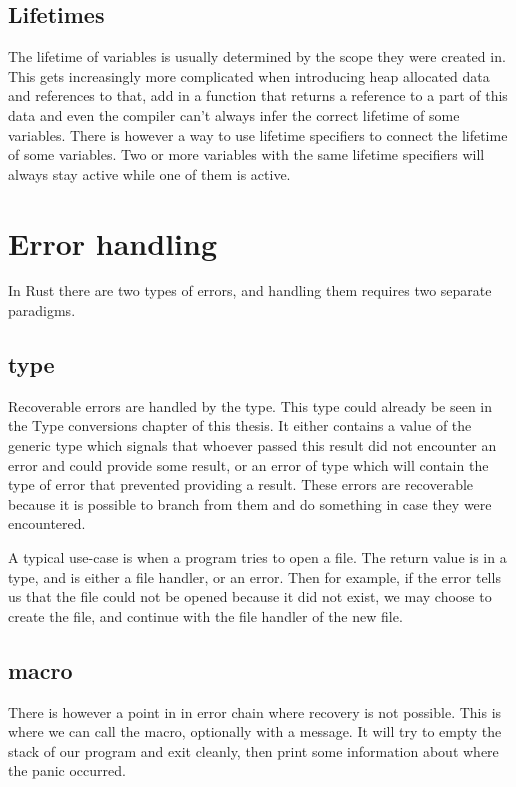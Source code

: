 \subsection{Lifetimes}

The lifetime of variables is usually determined by the scope they were created in. This gets increasingly more complicated when introducing heap allocated data and references to that, add in a function that returns a reference to a part of this data and even the compiler can't always infer the correct lifetime of some variables. There is however a way to use lifetime specifiers to connect the lifetime of some variables. Two or more variables with the same lifetime specifiers will always stay active while one of them is active.

\section{Error handling}

In Rust there are two types of errors, and handling them requires two separate paradigms.

\subsection{ type}

Recoverable errors are handled by the  type. This type could already be seen in the Type conversions chapter of this thesis. It either contains a value of the generic  type which signals that whoever passed this result did not encounter an error and could provide some result, or an error of type  which will contain the type of error that prevented providing a result. These errors are recoverable because it is possible to branch from them and do something in case they were encountered.

A typical use-case is when a program tries to open a file. The return value is in a  type, and is either a file handler, or an error. Then for example, if the error tells us that the file could not be opened because it did not exist, we may choose to create the file, and continue with the file handler of the new file.

\subsection{ macro}

There is however a point in in error chain where recovery is not possible. This is where we can call the  macro, optionally with a message. It will try to empty the stack of our program and exit cleanly, then print some information about where the panic occurred.

